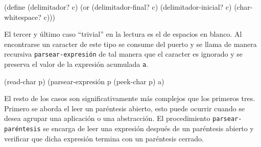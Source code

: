 \nwenddocs{}\plusendmoddef
(define (delimitador? c)
  (or (delimitador-final? c)
      (delimitador-inicial? c)
      (char-whitespace? c)))

\eatline
{}\nwendcode{}\nwdocspar

El tercer y último caso ``trivial'' en la lectura es el de espacios en blanco. Al encontrarse un caracter de este tipo se consume del puerto y se llama de manera recursiva {\tt{}\protect{}parsear-expresión} de tal manera que el caracter es ignorado y se preserva el valor de la expresión acumulada {\tt{}a}.

\nwenddocs{}\endmoddef
(read-char p)
(parsear-expresión p (peek-char p) a)
\nwendcode{}\nwdocspar

El resto de los casos son significativamente más complejos que los primeros tres. Primero se aborda el leer un paréntesis abierto, esto puede ocurrir cuando se desea agrupar una aplicación o una abstracción. El procedimiento {\tt{}\protect{}parsear-paréntesis} se encarga de leer una expresión después de un paréntesis abierto y verificar que dicha expresión termina con un paréntesis cerrado.

